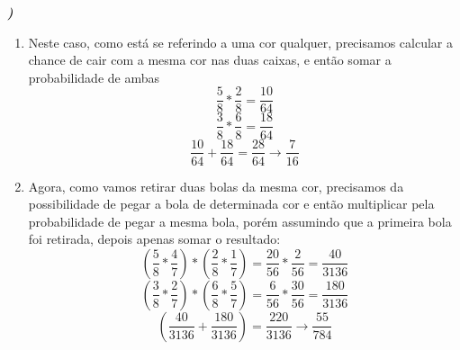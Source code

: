 \documentclass[12pt]{article}
\newcounter{instn}
\newcommand{\instnum}{\arabic{instn}}
\newcommand{\myline}[1]{
    \emph{\textbf{#1)}}
    \addtocounter{instn}{1}
}
\newenvironment{question}
 {
    \myline{\instnum} 
    }
    {
 }
\begin{document}
    \begin{question}
        \begin{enumerate}[label={\textbf{\alph*)}}]
            \item Neste caso, como está se referindo a uma cor qualquer, precisamos calcular a chance de cair com a mesma cor 
            nas duas caixas, e então somar a probabilidade de ambas
            \[
                \frac{5}{8} * \frac{2}{8} = \frac{10}{64}  
            \]
            \[
                \frac{3}{8} * \frac{6}{8} = \frac{18}{64}  
            \]
            \begin{equation}
                \frac{10}{64} + \frac{18}{64} = \frac{28}{64} \rightarrow \frac{7}{16}
            \end{equation}
            \item Agora, como vamos retirar duas bolas da mesma cor, precisamos da possibilidade de pegar a bola de determinada cor 
            e então multiplicar pela probabilidade de pegar a mesma bola, porém assumindo que a primeira bola foi retirada, depois apenas somar 
            o resultado:
            \[
                (\frac{5}{8} * \frac{4}{7}) * (\frac{2}{8} * \frac{1}{7}) = \frac{20}{56} * \frac{2}{56} = \frac{40}{3136}
            \]
            \[
                (\frac{3}{8} * \frac{2}{7}) * (\frac{6}{8} * \frac{5}{7}) = \frac{6}{56} * \frac{30}{56} =  \frac{180}{3136} 
            \]
            \begin{equation}
                (\frac{40}{3136} + \frac{180}{3136} )  = \frac{220}{3136} \rightarrow \frac{55}{784}
            \end{equation}

        \end{enumerate}
    \end{question}
\end{document}
